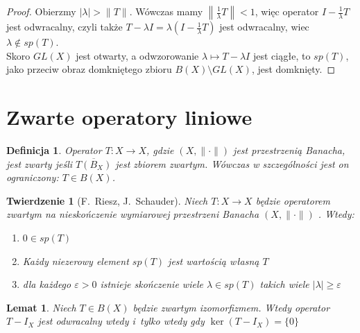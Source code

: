 \documentclass[11pt]{mwrep}
\renewcommand{\[}{\begin{equation}}
\renewcommand{\]}{\end{equation}}
\newcommand{\norm}{\|\cdot\|}
\newcommand{\spac}[1][X]{$(#1,\norm)$ }
\newtheorem{twr}[subsection]{Twierdzenie}%
\newtheorem{lem}[subsection]{Lemat}
\newtheorem{de}[subsection]{Definicja}
\newcounter{numer}
\begin{document}
\begin{proof}
	Obierzmy $|\lambda| >\|T\|$. Wówczas mamy $\left\| \frac{1}{\lambda} T\right\|<1$, więc operator  $I- \frac{1}{\lambda}T$ jest odwracalny, czyli
	także $T - \lambda I = \lambda\left( I -\frac{1}{\lambda}T \right)$ jest odwracalny, wiec $\lambda\not \in sp(T)$. \\
	Skoro $GL(X)$ jest otwarty, a odwzorowanie $\lambda \mapsto T - \lambda I$ jest ciągłe, to $sp(T)$, jako 	przeciw obraz domkniętego zbioru $B(X) \setminus GL(X)$, 
	jest domknięty.
\end{proof}
\section{Zwarte operatory liniowe}
\begin{de}
	Operator $T\colon X\to X$, gdzie \spac jest przestrzenią Banacha, jest zwarty jeśli $\overline{T(B_X)}$ jest zbiorem zwartym. Wówczas w szczególności jest on ograniczony: $T\in B(X)$.
\end{de}
\begin{twr}[F.~Riesz, J.~Schauder]
	Niech $T\colon X \to X$ będzie operatorem zwartym na nieskończenie wymiarowej przestrzeni Banacha \spac. Wtedy:
	\begin{enumerate}
		\item $0\in sp(T)$
		\item Każdy niezerowy element $sp(T)$ jest wartością własną $T$ 
	\item dla każdego $\varepsilon>0$ istnieje  skończenie wiele $\lambda \in sp(T)$ takich wiele $|\lambda|\ge\varepsilon$ 
	\end{enumerate}
\end{twr}
\begin{lem}
	\label{lem:173}
	Niech $T\in B(X)$ będzie zwartym izomorfizmem. Wtedy operator $T-I_X$ jest odwracalny wtedy i~tylko wtedy gdy $\ker (T-I_X) =\{0\}$ 
\end{lem}
\end{document}
